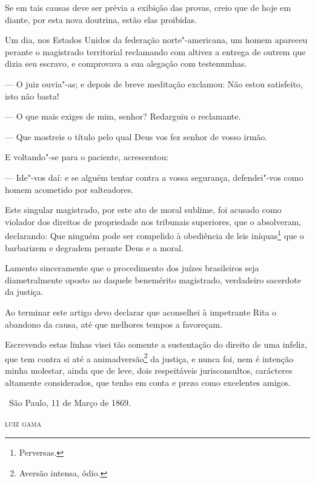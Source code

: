 Se em tais causas deve ser prévia a exibição das provas, creio que de
hoje em diante, por esta nova doutrina, estão elas proibidas.

Um dia, nos Estados Unidos da federação norte"-americana, um homem
apareceu perante o magistrado territorial reclamando com altivez a
entrega de outrem que dizia seu escravo, e comprovava a sua alegação com
testemunhas.

--- O juiz ouvia"-as; e depois de breve meditação exclamou: Não estou
satisfeito, isto não basta!

--- O que mais exiges de mim, senhor? Redarguiu o reclamante.

--- Que mostreis o título pelo qual Deus vos fez senhor de vosso irmão.

E voltando"-se para o paciente, acrescentou:

--- Ide"-vos daí: e se alguém tentar contra a vossa segurança,
defendei"-vos como homem acometido por salteadores.

Este singular magistrado, por este ato de moral sublime, foi acusado
como violador dos direitos de propriedade nos tribunais superiores, que
o absolveram, declarando: Que ninguém pode ser compelido à obediência de
leis iníquas\footnote{Perversas.} que o barbarizem e degradem perante
Deus e a moral.

Lamento sinceramente que o procedimento dos juízes brasileiros seja
diametralmente oposto ao daquele benemérito magistrado, verdadeiro
sacerdote da justiça.

Ao terminar este artigo devo declarar que aconselhei à impetrante Rita o
abandono da causa, até que melhores tempos a favoreçam.

Escrevendo estas linhas visei tão somente a sustentação do direito de
uma infeliz, que tem contra si até a animadversão\footnote{Aversão
  intensa, ódio.} da
justiça, e nunca foi, nem é intenção minha molestar, ainda que de leve,
dois respeitáveis jurisconsultos, carácteres altamente considerados, que
tenho em conta e prezo como excelentes amigos.

\vfill

\hfill\ São Paulo, 11 de Março de 1869.\smallskip

\hfill\textsc{luiz gama}


\pagebreak
\mbox{}\vfill
\thispagestyle{empty}

